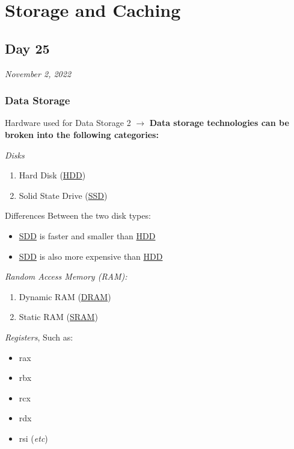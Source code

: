 \documentclass{report}
\begin{document}
\chapter{Storage and Caching}
\section{Day 25}
\begin{flushright}
  \emph{November 2, 2022}
\end{flushright}



\subsection{Data Storage}
  \begin{example} {Hardware used for Data Storage} { 2 }
    $\to$ \textbf{Data storage technologies can be broken into the following categories:} \\
    \par \emph {Disks}
    \begin{enumerate}
      \item Hard Disk (\underline{HDD})
    \item Solid State Drive (\underline{SSD})   \\
    \end{enumerate}
    \par
    Differences Between the two disk types: \\
    \begin{itemize}
      \item \underline{SDD} is faster and smaller than \underline{HDD}
      \item \underline{SDD} is also more expensive than \underline{HDD} \\
    \end{itemize}
    \par
    \emph{Random Access Memory (RAM): }\\
    \begin{enumerate}
      \item Dynamic RAM (\underline{DRAM})
      \item Static RAM (\underline{SRAM}) \\
    \end{enumerate}
    \par
    \emph {Registers}, Such as:
    \begin{itemize}
      \item rax
      \item rbx
      \item rcx
      \item rdx
      \item rsi (\emph{etc})
    \end{itemize}
  \end{example} 
\end{document}
